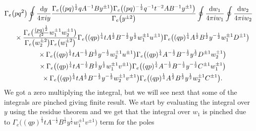 \documentclass[a4paper,12pt]{article}
\begin{document}
\begin{gather}
\Gamma_e\big(pq^2\big)\oint \frac{{\rm d}y}{4\pi i y} \frac{\Gamma_e\big((pq)^\frac12 q A^{-1} B y^{\pm1}\big)\Gamma_e\big((pq)^{-\frac12}q^{-1}t^{-2}AB^{-1}y^{\pm1}\big)}{\Gamma_e\big(y^{\pm2}\big)}\oint\frac{{\rm d}w_1}{4\pi i w_1}\oint \frac{{\rm d}w_2}{4\pi i w_2}\nonumber\\
\quad{} \times \frac{\Gamma_e\big(\frac{(p q)^{\frac12}}{t^2}w_1^{\pm1}w_2^{\pm1}\big)}{\Gamma_e\big(w_2^{\pm2}\big)\Gamma_e\big(w_1^{\pm2}\big)}\Gamma_e\big( (q p)^{\frac14}t A^{\frac12}B^{-\frac12} y^{\frac12} w_1^{\pm1}u^{\pm1}\big)\Gamma_e\big((qp)^{\frac14} A^{\frac12} B^{\frac12} y^{-\frac12} w_1^{\pm1}D^{\pm1}\big)
\nonumber\\
 \quad{} \times \Gamma_e\big((q p)^{\frac14} t A^{-\frac12} B^{\frac12} y^{-\frac12} w_2^{\pm1} u^{\pm1}\big) \Gamma_e \big((q p)^{\frac14} A^{-\frac12} B^{-\frac12} y^{\frac12} D^{\pm1}w_2^{\pm1}\big)\nonumber\\
 \quad{}\times \Gamma_e\big((q p)^{\frac14} t A^{-\frac12} B^\frac12 y^\frac12 w_1^{\pm1} v^{\pm1}\big)
 \Gamma_e\big( ( q p)^{\frac14} A^{-\frac12} B^{-\frac12} y^{-\frac12} C^{\pm1} w_1^{\pm1}\big)\nonumber\\
\quad{}\times \Gamma_e\big( ( q p )^{\frac14} t A^{\frac12} B^{-\frac12} y^{-\frac12} w_2^{\pm1} v^{\pm1}\big) \Gamma_e\big( ( q p )^{\frac14} A^{\frac12} B^\frac12 y^\frac12 w_2^{\pm1} C^{\pm1}\big) .
\end{gather}
We got a zero multiplying the integral, but we will see next that some of the integrals are pinched giving finite result. We start by evaluating the integral over $y$ using the residue theorem and we get that the integral over $w_1$ is pinched due to $\Gamma_e\big((q p)^{\frac14} t A^{-\frac12} B^\frac12 y^\frac12 w_1^{\pm1} v^{\pm1}\big)$ term for the poles
\end{document}
